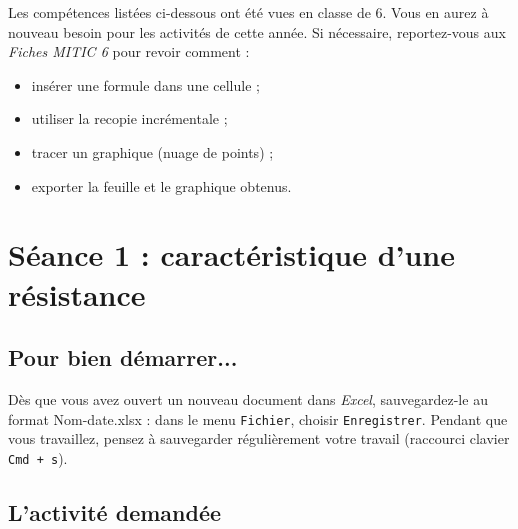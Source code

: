 \phantom{rien}

Les compétences listées ci-dessous ont été vues en classe de 6. Vous en aurez à nouveau besoin pour les activités de cette année. Si nécessaire, reportez-vous aux \emph{Fiches MITIC 6} pour revoir comment :  

\begin{itemize}
\item insérer une formule dans une cellule ;
\item utiliser la recopie incrémentale ;
\item tracer un graphique (nuage de points) ;
\item exporter la feuille et le graphique obtenus.
\end{itemize}



%
%
%
%

\newpage



\section{Séance 1 : caractéristique d'une résistance}\label{ficheTableur5e1}


\subsection{Pour bien démarrer...}

Dès que vous avez ouvert un nouveau document dans \emph{Excel}, sauvegardez-le au format Nom-date.xlsx : dans le menu \texttt{Fichier}, choisir \texttt{Enregistrer}. Pendant que vous travaillez, pensez à sauvegarder régulièrement votre travail (raccourci clavier \texttt{Cmd + s}).   



\subsection{L'activité demandée}

\vspace{10pt}

